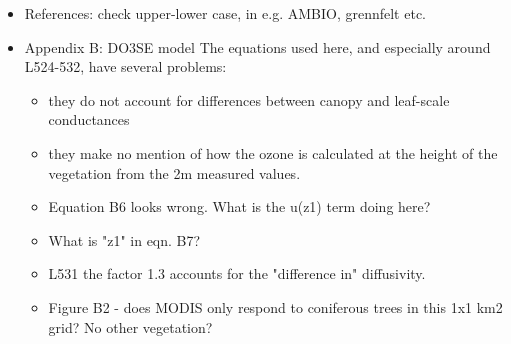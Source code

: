 \documentclass{scrartcl}
\begin{document}
\begin{itemize}
\item {\color{blue}References: check upper-lower case, in e.g. AMBIO, grennfelt etc.}
 
\item {\color{blue}Appendix B: DO3SE model
The equations used here, and especially around L524-532, have several problems:
\begin{itemize}
\item they do not account for differences between canopy and leaf-scale conductances
\item they make no mention of how the ozone is calculated at the height of the vegetation from the 2m measured values.
\item Equation B6 looks wrong. What is the u(z1) term doing here?
\item What is "z1" in eqn. B7?
\item L531 the factor 1.3 accounts for the "difference in" diffusivity.
\item Figure B2 - does MODIS only respond to coniferous trees in this 1x1 km2 grid? No other vegetation?
\end{itemize}}
  

\end{itemize}
\end{document}
